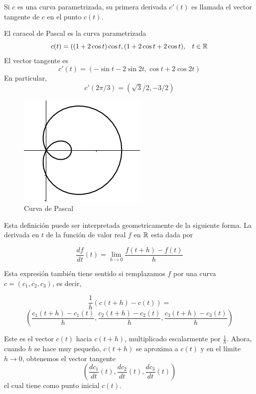 \begin{definition}
    Si $c$ es una curva parametrizada, su primera derivada $c'(t)$ es llamada el vector tangente
    de $c$ en el punto $c(t)$.
\end{definition}

\begin{myExample}
    El caracol de Pascal es la curva parametrizada
    $$ c(t)=((1+2\cos{t})\cos{t},(1+2\cos{t}+2\cos{t})\text{,} \quad t \in \mathbb{R}$$
    El vector tangente es
    $$ c'(t)=(-\sin{t}-2\sin{2t},\cos{t}+2\cos{2t})$$
    En particular,
    $$ c'(2\pi/3) = (\sqrt{3}/2,-3/2)$$
\end{myExample}

\begin{figure}[!ht]
  \begin{center}
      \includegraphics[width=0.7\linewidth]{gfx/limacon2}
      \caption{Curva de Pascal}
      \label{fig:boat1}
  \end{center}
\end{figure}


Esta definición puede ser interpretada geometricamente de la siguiente forma. La derivada en
$t$ de la función de valor real $f$ en $\mathbb{R}$ esta dada por

$$ \frac{df}{dt}(t) = \lim_{h \rightarrow 0} \frac{f(t+h)-f(t)}{h} $$

Esta expresión también tiene sentido si remplazamos $f$ por una curva $c = (c_{1},c_{2},c_{3})$,
es decir,

$$ \frac{1}{h}(c(t+h)-c(t)) =$$
$$\left( \frac{c_{1}(t+h)-c_{1}(t)}{h},\frac{c_{2}(t+h)-c_{2}(t)}{h},\frac{c_{3}(t+h)-c_{3}(t)}{h} \right) $$

Este es el vector $c(t)$ hacia $c(t+h)$, multiplicado escalarmente por $\frac{1}{h}$. Ahora, cuando $h$ se hace
muy pequeño, $c(t+h)$ se aproxima a $c(t)$ y en el límite $h \rightarrow 0$, obtenemos el vector tangente
$$\left( \frac{dc_{1}}{dt}(t),\frac{dc_{2}}{dt}(t),\frac{dc_{3}}{dt}(t) \right) $$
el cual tiene como punto inicial $c(t)$.

